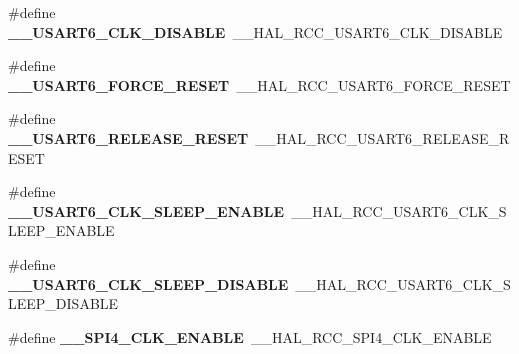 \begin{DoxyCompactItemize}
\item 
\#define {\bfseries \+\_\+\+\_\+\+U\+S\+A\+R\+T6\+\_\+\+C\+L\+K\+\_\+\+D\+I\+S\+A\+B\+LE}~\+\_\+\+\_\+\+H\+A\+L\+\_\+\+R\+C\+C\+\_\+\+U\+S\+A\+R\+T6\+\_\+\+C\+L\+K\+\_\+\+D\+I\+S\+A\+B\+LE\hypertarget{group___h_a_l___r_c_c___aliased_ga0b5f454318d65779b4fcb8f415181852}{}\label{group___h_a_l___r_c_c___aliased_ga0b5f454318d65779b4fcb8f415181852}

\item 
\#define {\bfseries \+\_\+\+\_\+\+U\+S\+A\+R\+T6\+\_\+\+F\+O\+R\+C\+E\+\_\+\+R\+E\+S\+ET}~\+\_\+\+\_\+\+H\+A\+L\+\_\+\+R\+C\+C\+\_\+\+U\+S\+A\+R\+T6\+\_\+\+F\+O\+R\+C\+E\+\_\+\+R\+E\+S\+ET\hypertarget{group___h_a_l___r_c_c___aliased_ga1a9db7963c878ef6018ff9bbc439e8ca}{}\label{group___h_a_l___r_c_c___aliased_ga1a9db7963c878ef6018ff9bbc439e8ca}

\item 
\#define {\bfseries \+\_\+\+\_\+\+U\+S\+A\+R\+T6\+\_\+\+R\+E\+L\+E\+A\+S\+E\+\_\+\+R\+E\+S\+ET}~\+\_\+\+\_\+\+H\+A\+L\+\_\+\+R\+C\+C\+\_\+\+U\+S\+A\+R\+T6\+\_\+\+R\+E\+L\+E\+A\+S\+E\+\_\+\+R\+E\+S\+ET\hypertarget{group___h_a_l___r_c_c___aliased_ga78937fd5dc3a98a2aea8b54a276ab49a}{}\label{group___h_a_l___r_c_c___aliased_ga78937fd5dc3a98a2aea8b54a276ab49a}

\item 
\#define {\bfseries \+\_\+\+\_\+\+U\+S\+A\+R\+T6\+\_\+\+C\+L\+K\+\_\+\+S\+L\+E\+E\+P\+\_\+\+E\+N\+A\+B\+LE}~\+\_\+\+\_\+\+H\+A\+L\+\_\+\+R\+C\+C\+\_\+\+U\+S\+A\+R\+T6\+\_\+\+C\+L\+K\+\_\+\+S\+L\+E\+E\+P\+\_\+\+E\+N\+A\+B\+LE\hypertarget{group___h_a_l___r_c_c___aliased_gaabd2ca8c095af0b15f7da6145c4bf5ee}{}\label{group___h_a_l___r_c_c___aliased_gaabd2ca8c095af0b15f7da6145c4bf5ee}

\item 
\#define {\bfseries \+\_\+\+\_\+\+U\+S\+A\+R\+T6\+\_\+\+C\+L\+K\+\_\+\+S\+L\+E\+E\+P\+\_\+\+D\+I\+S\+A\+B\+LE}~\+\_\+\+\_\+\+H\+A\+L\+\_\+\+R\+C\+C\+\_\+\+U\+S\+A\+R\+T6\+\_\+\+C\+L\+K\+\_\+\+S\+L\+E\+E\+P\+\_\+\+D\+I\+S\+A\+B\+LE\hypertarget{group___h_a_l___r_c_c___aliased_gafaf27c45d3b3da58e5144c54a6765166}{}\label{group___h_a_l___r_c_c___aliased_gafaf27c45d3b3da58e5144c54a6765166}

\item 
\#define {\bfseries \+\_\+\+\_\+\+S\+P\+I4\+\_\+\+C\+L\+K\+\_\+\+E\+N\+A\+B\+LE}~\+\_\+\+\_\+\+H\+A\+L\+\_\+\+R\+C\+C\+\_\+\+S\+P\+I4\+\_\+\+C\+L\+K\+\_\+\+E\+N\+A\+B\+LE\hypertarget{group___h_a_l___r_c_c___aliased_ga910bbf1355bfeb7eaa6ee38c71073f74}{}\label{group___h_a_l___r_c_c___aliased_ga910bbf1355bfeb7eaa6ee38c71073f74}


\end{DoxyCompactItemize}
